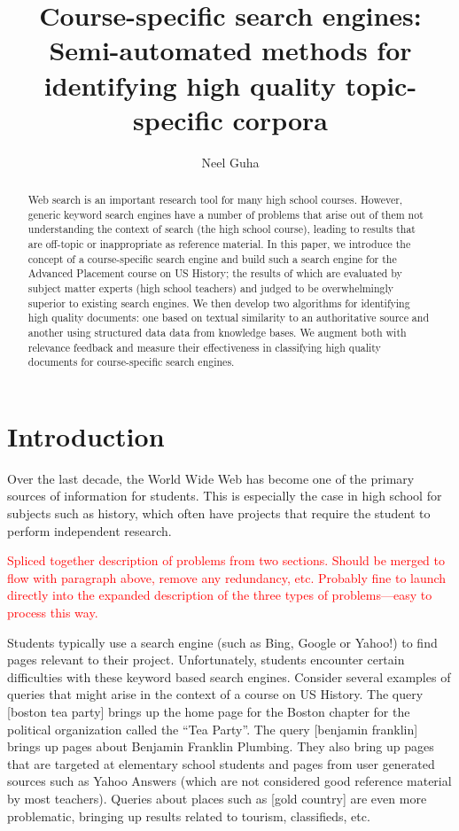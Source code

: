 \documentclass{acm_proc_article-sp}
\begin{document}
\title{Course-specific search engines: Semi-automated methods for identifying
  high quality topic-specific corpora} 

\author{
  \alignauthor
  Neel Guha \\
}

\maketitle
\begin{abstract}
Web search is an important research tool for many high school courses. However,
generic keyword search engines have a number of problems that arise out of them
not understanding the context of search (the high school course),
leading to results that are off-topic or inappropriate as reference material. In
this paper, we introduce the concept of a course-specific search 
engine and build such a search engine for the Advanced Placement course on US
History; the results of which are evaluated by subject matter experts (high
school teachers) and judged to be overwhelmingly superior to existing search engines. We
then develop two algorithms for identifying high quality documents: one 
based on textual similarity to an authoritative source and another using structured
data data from knowledge bases. We augment both with relevance feedback and
measure their effectiveness in classifying high quality documents for
course-specific search engines. 
\end{abstract}

\section{Introduction}

Over the last decade, the World Wide Web has become one of the primary sources
of information for students. This is especially the case in high school for
subjects such as history, which often have projects that require the student to
perform independent research. 

\textcolor{red}{Spliced together description of problems from two sections. Should be
  merged to flow with paragraph above, remove any redundancy, etc. Probably fine
  to launch directly into the expanded description of the three types of
  problems---easy to process this way.}

Students typically use a search engine (such as Bing, Google or Yahoo!) to find
pages relevant to their project. Unfortunately, students encounter certain
difficulties with these keyword based search engines.  Consider several examples
of queries that might arise in the context of a course on US History. The query
[boston tea party] brings up the home page for the Boston chapter for the
political organization called the ``Tea Party''. The query [benjamin franklin]
brings up pages about Benjamin Franklin Plumbing. They also bring up pages that
are targeted at elementary school students and pages from user generated sources
such as Yahoo Answers  (which are not considered good reference material by most
teachers). Queries about places such as [gold country] are even more
problematic, bringing up results related to tourism, classifieds, etc. 
\end{document}
